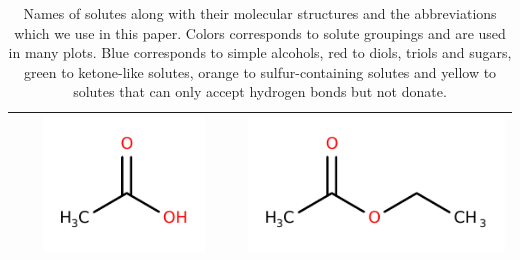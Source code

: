 \documentclass[journal=jpcbfk,manuscript=article]{achemso}
\begin{document}
\begin{table}[h!]
\begin{tabular}{ |m{3.5cm}m{1.4cm}m{2cm}|m{3.8cm}m{1.4cm}m{2cm}| }
    \color{green!40!olive}{Acetic Acid} & \color{green!40!olive}{AcOH} &     
    \begin{minipage}{.1\textwidth}
    \includegraphics[width=\linewidth]{structures/ACH.pdf}
    \end{minipage} &
    
    \color{yellow!70!orange}{Ethyl Acetate} & \color{yellow!70!orange}{EAC} &     
    \begin{minipage}{.1\textwidth}
    \includegraphics[width=\linewidth]{structures/EAC.pdf}
    \end{minipage} \\
  
    \hline
  \end{tabular}
  \caption{Names of solutes along with their molecular structures and the
  abbreviations which we use in this paper. Colors corresponds to solute groupings
  and are used in many plots. Blue corresponds to simple alcohols, red to 
  diols, triols and sugars, green to ketone-like solutes, orange to sulfur-containing
  solutes and yellow to solutes that can only accept hydrogen bonds but not donate.}\label{table:abbreviations}
  \end{table}
\end{document}
